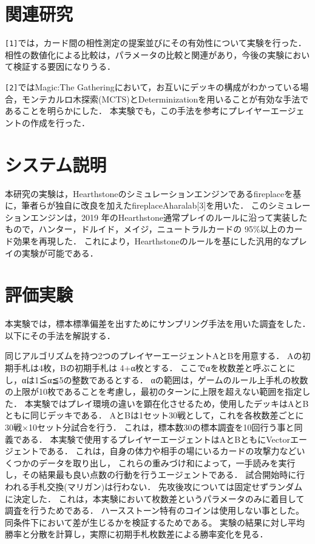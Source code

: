 \documentclass[twocolumn]{ltjsarticle}
\begin{document}
\section{関連研究}
\small{
  \verb#[1]#では，カード間の相性測定の提案並びにその有効性について実験を行った．
  相性の数値化による比較は，パラメータの比較と関連があり，今後の実験において検証する要因になりうる．

  \verb#[2]#ではMagic:The Gatheringにおいて，お互いにデッキの構成がわかっている場合，モンテカルロ木探索(MCTS)とDeterminizationを用いることが有効な手法であることを明らかにした．
  本実験でも，この手法を参考にプレイヤーエージェントの作成を行った．
}
\section{システム説明}
\small{
  本研究の実験は，Hearthstoneのシミュレーションエンジンであるfireplaceを基に，筆者らが独自に改良を加えたfireplaceAharalab[3]を用いた．
  このシミュレーションエンジンは，2019 年のHearthstone通常プレイのルールに沿って実装したもので，ハンター，ドルイド，メイジ，ニュートラルカードの 95\%以上のカード効果を再現した．
  これにより，Hearthstoneのルールを基にした汎用的なプレイの実験が可能である．
}
\section{評価実験}
\small{
  本実験では，標本標準偏差を出すためにサンプリング手法を用いた調査をした．
  以下にその手法を解説する．

  同じアルゴリズムを持つ2つのプレイヤーエージェントAとBを用意する．
  Aの初期手札は4枚，Bの初期手札は 4+α枚とする．
  ここでαを枚数差と呼ぶことにし，αは1≦α≦5の整数であるとする．
  αの範囲は，ゲームのルール上手札の枚数の上限が10枚であることを考慮し，最初のターンに上限を超えない範囲を指定した．
  本実験ではプレイ環境の違いを顕在化させるため，使用したデッキはAとBともに同じデッキである．
  AとBは1セット30戦として，これを各枚数差ごとに30戦×10セット分試合を行う．
  これは，標本数30の標本調査を10回行う事と同義である．
  本実験で使用するプレイヤーエージェントはAとBともにVectorエージェントである．
  これは，自身の体力や相手の場にいるカードの攻撃力などいくつかのデータを取り出し，
  これらの重みづけ和によって，一手読みを実行し，その結果最も良い点数の行動を行うエージェントである．
  試合開始時に行われる手札交換(マリガン)は行わない．
  先攻後攻については固定せずランダムに決定した．
  これは，本実験において枚数差というパラメータのみに着目して調査を行うためである．
  ハースストーン特有のコインは使用しない事とした。同条件下において差が生じるかを検証するためである。
  実験の結果に対し平均勝率と分散を計算し，実際に初期手札枚数差による勝率変化を見る．
}
\end{document}
